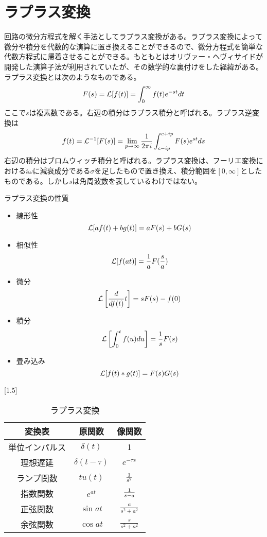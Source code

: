 
\section{ラプラス変換}
    回路の微分方程式を解く手法としてラプラス変換がある。ラプラス変換によって微分や積分を代数的な演算に置き換えることができるので、微分方程式を簡単な代数方程式に帰着させることができる。もともとはオリヴァー・ヘヴィサイドが開発した演算子法が利用されていたが、その数学的な裏付けをした経緯がある。ラプラス変換とは次のようなものである。
        \[F(s) = \mathcal{L}[f(t)] = \int_0^{\infty} f(t)e^{-st}dt\]
    ここで$s$は複素数である。右辺の積分はラプラス積分と呼ばれる。ラプラス逆変換は
        \[f(t) = \mathcal{L}^{-1}[F(s)] = \lim_{p \to \infty} \frac{1}{2\pi i}\int_{c-ip}^{c+ip} F(s)e^{st}ds\]
    右辺の積分はブロムウィッチ積分と呼ばれる。ラプラス変換は、フーリエ変換における$i\omega$に減衰成分である$\sigma$を足したもので置き換え、積分範囲を$[0,\infty]$としたものである。しかし$s$は角周波数を表しているわけではない。

    ラプラス変換の性質
    \begin{itemize}
        \item 線形性\[\mathcal{L}[af(t)+bg(t)] = aF(s)+bG(s)\]
        \item 相似性\[\mathcal{L}[f(at)] = \frac{1}{a}F(\frac{s}{a})\]
        \item 微分\[\mathcal{L}\left[\frac{d }{d f(t)}{t} \right] = sF(s)-f(0)\]
        \item 積分\[\mathcal{L}\left[\int_0^t f(u)du \right] = \frac{1}{s}F(s)\]
        \item 畳み込み\[\mathcal{L}[f(t) * g(t)] = F(s)G(s)\]
    \end{itemize}
    \begin{table}[h]
        \begin{center}\caption{\large ラプラス変換}
        \scalebox{1.5}[1.5]{
            \begin{tabular}{|c|c|c|}\hline
                変換表 & 原関数 & 像関数\\ \hline
                単位インパルス & $\delta(t)$ & 1\\ \hline
                理想遅延 & $\delta(t - \tau)$ & $e^{-\tau s}$\\ \hline
                ランプ関数 & $tu(t)$ & $\frac{1}{s^2}$\\ \hline
                指数関数 & $e^{at}$ & $\frac{1}{s-a}$\\ \hline
                正弦関数 & $\sin at$ & $\displaystyle\frac{a}{s^2+a^2}$\\ \hline
                余弦関数 & $\cos at$ & $\displaystyle\frac{s}{s^2+a^2}$\\ \hline
            \end{tabular}
        }\end{center}
    \end{table}
